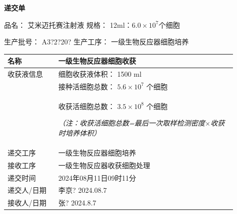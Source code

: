 \documentclass[UTF8,10pt,a4paper,fontset=fandol]{ctexart}
\newcommand{\fieldvalue}[1]{#1}
\newcommand{\handwritten}[1]{#1}
\begin{document}
\begin{center}
\textbf{递交单}
\end{center}

\noindent
品名：
\fieldvalue{艾米迈托赛注射液}
\hfill
规格：
\fieldvalue{12ml：$6.0\times10^{7}$个细胞}

\noindent
生产批号：
\fieldvalue{\handwritten{A3?2?20?}}
\hfill
生产工序：
\fieldvalue{一级生物反应器细胞培养}

\begin{center}
\begin{tabular}{|p{0.20\linewidth}|p{0.70\linewidth}|}
\hline
名称 & 一级生物反应器细胞收获\\
\hline
\multirow{1}{*}{收获液信息} &
细胞收获液体积：
\fieldvalue{\handwritten{1500}} ml
\\[-1mm]
&
接种活细胞总数：
\fieldvalue{\handwritten{$5.6\times10^{7}$}} 个细胞
\\[-1mm]
&
收获活细胞总数：
\fieldvalue{\handwritten{$3.5\times10^{8}$}} 个细胞

\textit{（注：收获活细胞总数=最后一次取样检测密度$\times$收获时培养体积）}\\
\hline
递交工序 & 一级生物反应器细胞培养\\
\hline
接收工序 & 一级生物反应器收获细胞处理\\
\hline
递交时间 &
\fieldvalue{\handwritten{2024年08月11日09时11分}}\\
\hline
递交人/日期 &
\fieldvalue{\handwritten{李京? 2024.08.7}}\\
\hline
接收人/日期 &
\fieldvalue{\handwritten{张? 2024.8.7}}\\
\hline
\end{tabular}
\end{center}
\end{document}
